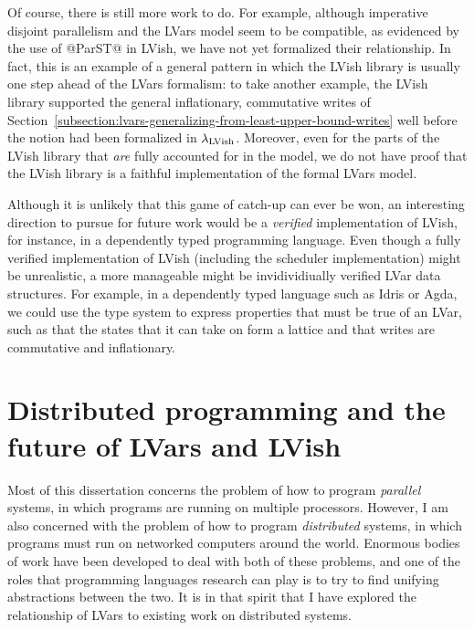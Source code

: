 Of course, there is still more work to do.  For example, although
imperative disjoint parallelism and the LVars model seem to be
compatible, as evidenced by the use of @ParST@ in LVish, we have not
yet formalized their relationship.  In fact, this is an example of a
general pattern in which the LVish library is usually one step ahead
of the LVars formalism: to take another example, the LVish library
supported the general inflationary, commutative writes of
Section~\ref{subsection:lvars-generalizing-from-least-upper-bound-writes}
well before the notion had been formalized in $\lambda_{\textrm{LVish}}$.
Moreover, even for the parts of the LVish library that \emph{are}
fully accounted for in the model, we do not have proof that the LVish
library is a faithful implementation of the formal LVars model.

Although it is unlikely that this game of catch-up can ever be won, an
interesting direction to pursue for future work would be a
\emph{verified} implementation of LVish, for instance, in a
dependently typed programming language.  Even though a fully verified
implementation of LVish (including the scheduler implementation) might
be unrealistic, a more manageable might be invidividiually verified
LVar data structures.  For example, in a dependently typed language
such as Idris or Agda, we could use the type system to express
properties that must be true of an LVar, such as that the states that
it can take on form a lattice and that writes are commutative and
inflationary.

\section{Distributed programming and the future of LVars and LVish}


Most of this dissertation concerns the problem of how to program
\emph{parallel} systems, in which programs are running on multiple
processors.  However, I am also concerned with the problem of how to
program \emph{distributed} systems, in which programs must run on
networked computers around the world.  Enormous bodies of work have
been developed to deal with both of these problems, and one of the
roles that programming languages research can play is to try to find
unifying abstractions between the two. It is in that spirit that I
have explored the relationship of LVars to existing work on
distributed systems.

